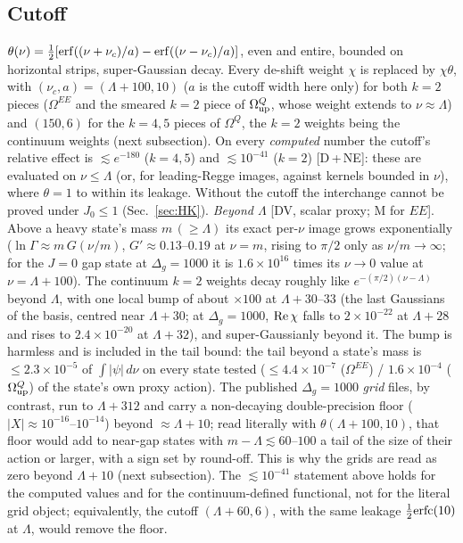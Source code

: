 \documentclass[aps,prl,onecolumn,superscriptaddress,nofootinbib]{revtex4-2}
\begin{document}
\subsection{Cutoff}
\label{sec:cutoff}
$\theta(\nu)=\tfrac12[{\rm erf}((\nu+\nu_c)/a)-{\rm erf}((\nu-\nu_c)/a)]$, even and entire,
bounded on horizontal strips, super-Gaussian decay. Every de-shift weight $\chi$ is replaced by
$\chi\theta$, with $(\nu_c,a)=(\Lambda+100,10)$ ($a$ is the cutoff width here only) for both $k=2$ pieces ($\Omega^{EE}$ and the smeared
$k=2$ piece of $\Omega^Q_{\rm up}$, whose weight extends to $\nu\approx\Lambda$) and $(150,6)$ for the
$k=4,5$ pieces of $\Omega^Q$, the $k=2$ weights being the continuum weights (next subsection). On every
\emph{computed} number the cutoff's relative effect is $\lesssim e^{-180}$ ($k=4,5$) and $\lesssim10^{-41}$ ($k=2$) [D\,+\,NE]: these
are evaluated on $\nu\le\Lambda$ (or, for leading-Regge images, against kernels bounded in $\nu$), where $\theta=1$ to within its
leakage. Without the cutoff the interchange cannot be proved under $J_0\le1$ (Sec.~\ref{sec:HK}).
\emph{Beyond $\Lambda$} [DV, scalar proxy; M for $EE$]. Above a heavy state's mass $m\,(\ge\Lambda)$ its exact per-$\nu$ image grows
exponentially ($\ln\Gamma\approx m\,G(\nu/m)$, $G'\approx0.13$--$0.19$ at $\nu=m$, rising to $\pi/2$ only as $\nu/m\to\infty$; for the
$J=0$ gap state at $\Delta_g=1000$ it is $1.6\times10^{16}$ times its $\nu\to0$ value at $\nu=\Lambda+100$). The continuum $k=2$ weights
decay roughly like $e^{-(\pi/2)(\nu-\Lambda)}$ beyond $\Lambda$, with one local bump of about $\times100$ at $\Lambda+30$--$33$ (the
last Gaussians of the basis, centred near $\Lambda+30$; at $\Delta_g=1000$, ${\rm Re}\,\chi$ falls to $2\times10^{-22}$ at $\Lambda+28$ and rises to
$2.4\times10^{-20}$ at $\Lambda+32$), and super-Gaussianly beyond it. The bump is harmless and is included in the tail bound: the
tail beyond a state's mass is
$\le2.3\times10^{-5}$ of $\int|\psi|\,d\nu$ on every state tested ($\le4.4\times10^{-7}$ ($\Omega^{EE}$) / $1.6\times10^{-4}$
($\Omega^Q_{\rm up}$) of the state's own proxy action). The published $\Delta_g=1000$ \emph{grid} files, by contrast, run to
$\Lambda+312$ and carry a non-decaying double-precision floor ($|X|\approx10^{-16}$--$10^{-14}$) beyond $\approx\Lambda+10$; read
literally with $\theta(\Lambda+100,10)$, that floor would add to near-gap states with $m-\Lambda\lesssim60$--$100$ a tail of the size
of their action or larger, with a sign set by round-off. This is why the grids are read as zero beyond $\Lambda+10$ (next
subsection). The $\lesssim10^{-41}$ statement above holds for the computed values and for the continuum-defined functional, not for
the literal grid object; equivalently, the cutoff $(\Lambda+60,6)$, with the same leakage $\tfrac12{\rm erfc}(10)$ at $\Lambda$,
would remove the floor.
\end{document}

